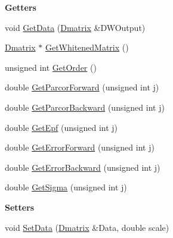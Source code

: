 \begin{Indent}\textbf{ Getters}\par
\begin{DoxyCompactItemize}
\item 
void \hyperlink{classtsa_1_1_l_s_lfilter_ad577b856b131f49de4e29eb2406560e9}{Get\+Data} (\hyperlink{namespacetsa_ad260cd21c1891c4ed391fe788569aba4}{Dmatrix} \&D\+W\+Output)
\item 
\hyperlink{namespacetsa_ad260cd21c1891c4ed391fe788569aba4}{Dmatrix} $\ast$ \hyperlink{classtsa_1_1_l_s_lfilter_a4b15685dc591ec522e2a34edcf87082b}{Get\+Whitened\+Matrix} ()
\item 
unsigned int \hyperlink{classtsa_1_1_l_s_lfilter_af7e46359752bd2839f4ed510ef625ce5}{Get\+Order} ()
\item 
double \hyperlink{classtsa_1_1_l_s_lfilter_a3a04a948854ddde91e3aa4bd8a5bf0eb}{Get\+Parcor\+Forward} (unsigned int j)
\item 
double \hyperlink{classtsa_1_1_l_s_lfilter_a21f41a8a1cbb800d0a1d4c3e474cc51e}{Get\+Parcor\+Backward} (unsigned int j)
\item 
double \hyperlink{classtsa_1_1_l_s_lfilter_a94d29deb2900d3be889b1288730112df}{Get\+Epf} (unsigned int j)
\item 
double \hyperlink{classtsa_1_1_l_s_lfilter_aad172e3d7c8743ea64b0dd32d9017bbd}{Get\+Error\+Forward} (unsigned int j)
\item 
double \hyperlink{classtsa_1_1_l_s_lfilter_ad9c27bb102a3cd25ceda75ab5bed4a7a}{Get\+Error\+Backward} (unsigned int j)
\item 
double \hyperlink{classtsa_1_1_l_s_lfilter_a06bbde7bf7ba9deed211b3a05ba82890}{Get\+Sigma} (unsigned int j)
\end{DoxyCompactItemize}
\end{Indent}
\begin{Indent}\textbf{ Setters}\par
\begin{DoxyCompactItemize}
\item 
void \hyperlink{classtsa_1_1_l_s_lfilter_ab01da31972cf54c49a28920c8235e8c9}{Set\+Data} (\hyperlink{namespacetsa_ad260cd21c1891c4ed391fe788569aba4}{Dmatrix} \&Data, double scale)
\end{DoxyCompactItemize}
\end{Indent}
